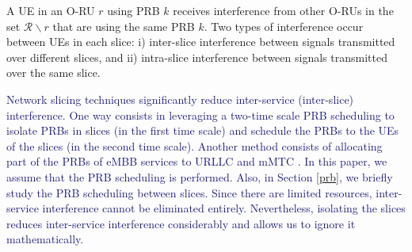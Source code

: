 \documentclass[lettersize,journal]{IEEEtran}
\begin{document}
A UE in an O-RU $r$ using PRB $k$ receives interference from other O-RUs in the set $\mathcal{R}\backslash r$ that are using the same PRB $k$. Two types of interference occur between UEs in each slice: i) inter-slice interference between signals transmitted over different slices, and ii) intra-slice interference between signals transmitted over the same slice.%
 
\textcolor{MidnightBlue}{Network slicing techniques significantly reduce inter-service (inter-slice) interference.
One way consists in leveraging a two-time scale PRB scheduling to isolate PRBs in slices (in the first time scale) and schedule the PRBs to the UEs of the slices (in the second time scale). Another method consists of allocating part of the PRBs of eMBB services to URLLC and mMTC \cite{alsenwi2021intelligent, setayesh2020joint, mei2021intelligent}. In this paper, we assume that the PRB scheduling is performed. Also, in Section \ref{prb}, we briefly study the PRB scheduling between slices.
Since there are limited resources, inter-service interference cannot be eliminated entirely. Nevertheless, isolating the slices reduces inter-service interference considerably and allows us to ignore it mathematically.}
\end{document}
